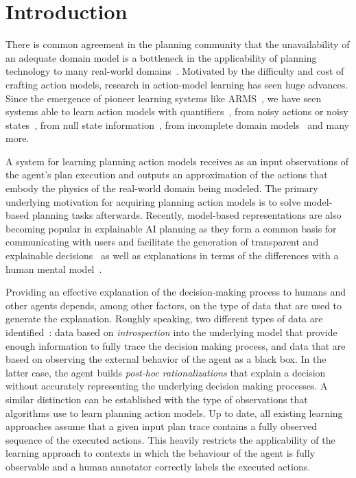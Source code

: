 
\section{Introduction}
\label{sec:introduction}

There is common agreement in the planning community that the unavailability of an \textcolor[rgb]{1.00,0.00,0.00}{adequate} domain model is a bottleneck in the applicability of planning technology to many real-world domains~\cite{kambhampati:modellite:AAAI2007}. Motivated by the difficulty and cost of crafting action models, research in action-model learning has seen huge advances. Since the emergence of pioneer learning systems like ARMS~\cite{yang2007learning}, we have seen systems able to learn action models with quantifiers~\cite{AmirC08,ZhuoYHL10}, from noisy actions or noisy states~\cite{zhuo2013action,MouraoZPS12}, from null state information~\cite{cresswell2013acquiring}, from incomplete domain models~\cite{ZhuoNK13,ZhuoK17} and many more.

A system for learning planning action models receives as an input observations of the agent's plan execution and \textcolor[rgb]{1.00,0.00,0.00}{outputs an approximation of the actions that embody the physics of the real-world domain being modeled}. The primary underlying motivation for acquiring planning action models is to solve model-based planning tasks afterwards. Recently, model-based representations are also becoming popular in explainable AI planning as they form a common basis for communicating with users and facilitate the generation of transparent and explainable decisions~\cite{FoxLM17} as well as explanations in terms of the differences with a human mental model~\cite{ChakrabortiSK18}.


\textcolor[rgb]{1.00,0.00,0.00}{Providing an effective explanation of the decision-making process to humans and other agents depends, among other factors, on the type of data that are used to generate the explanation. Roughly speaking, two different types of data are identified~\cite{Sheh17,Roberts18}: data based on \emph{introspection} into the underlying model that provide enough information to fully trace the decision making process, and data that are based on observing the external behavior of the agent as a black box. In the latter case, the agent builds \emph{post-hoc rationalizations} that explain a decision without accurately representing the underlying decision making processes.} A similar distinction can be established with the type of observations that algorithms use to learn planning action models. Up to date, all existing learning approaches assume that a given input plan trace contains a fully observed sequence of the executed actions. This heavily restricts the applicability of the learning approach to contexts in which the behaviour of the agent is fully observable and a human annotator correctly labels the executed actions.

